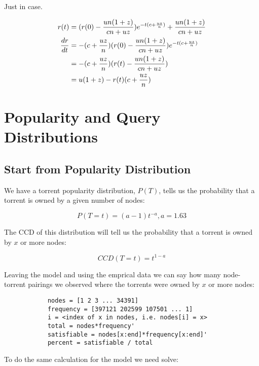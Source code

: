 \documentclass{article}
\begin{document}
        Just in case.

        \begin{align}
                     r(t) &= (r(0)-{un(1+z) \over cn+uz})e^{-t(c+{uz \over n})}+{un(1+z) \over cn+uz} \\
            {dr \over dt} &= -(c+{uz \over n})(r(0)-{un(1+z) \over cn+uz})e^{-t(c+{uz \over n})} \\
                          &= -(c+{uz \over n})(r(t)-{un(1+z) \over cn+uz}) \\
                          &= u(1+z)-r(t)(c+{uz \over n})
        \end{align}

\section{Popularity and Query Distributions}

    \subsection{Start from Popularity Distribution}

        We have a torrent popularity distribution, $P(T)$, tells us the probability that a torrent is owned by a given number of nodes:

        \begin{equation}
            P(T=t) = (a-1)t^{-a}, a=1.63
        \end{equation}

        The CCD of this distribution will tell us the probability that a torrent is owned by $x$ or more nodes:

        \begin{equation}
            CCD(T=t) = t^{1-a}
        \end{equation}

        Leaving the model and using the emprical data we can say how many node-torrent pairings we observed where the torrents were owned by $x$ or more nodes:

        \begin{verbatim}
            nodes = [1 2 3 ... 34391]
            frequency = [397121 202599 107501 ... 1]
            i = <index of x in nodes, i.e. nodes[i] = x>
            total = nodes*frequency'
            satisfiable = nodes[x:end]*frequency[x:end]'
            percent = satisfiable / total
        \end{verbatim}

        To do the same calculation for the model we need solve:
\end{document}
